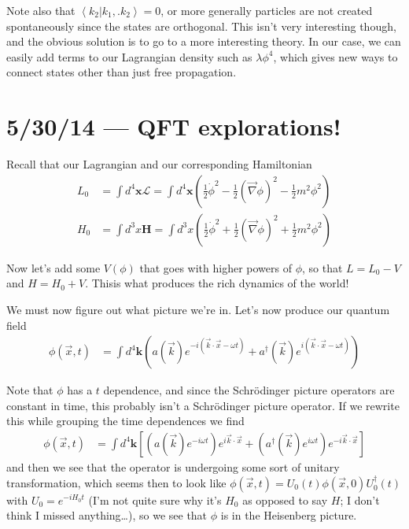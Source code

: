 \documentclass[10pt]{report}
\newcommand{\dotp}[2]{\left<#1\left.\right|#2\right>}
\begin{document}
Note also that $\dotp{k_2}{k_1,. k_2} = 0$, or more generally particles are not created spontaneously since the states are orthogonal. This isn't very interesting though, and the obvious solution is to go to a more interesting theory. In our case, we can easily add terms to our Lagrangian density such as $\lambda \phi^4$, which gives new ways to connect states other than just free propagation.
\chapter{5/30/14 --- QFT explorations!}

Recall that our Lagrangian and our corresponding Hamiltonian
\begin{align}
    L_0 &= \int d^4\mathbf{x} \mathcal{L} = \int d^4\mathbf{x} \left( \frac{1}{2}\dot{\phi}^2 - \frac{1}{2}\left( \vec{\nabla}\phi \right)^2 - \frac{1}{2}m^2\phi^2 \right)\\
    H_0 &= \int d^3x \mathbf{H} = \int d^3x \left( \frac{1}{2}\dot{\phi}^2 + \frac{1}{2}\left( \vec{\nabla}\phi \right)^2 + \frac{1}{2}m^2\phi^2 \right)
\end{align}

Now let's add some $V(\phi)$ that goes with higher powers of $\phi$, so that $L = L_0 - V$ and $H = H_0 + V$. Thisis what produces the rich dynamics of the world!

We must now figure out what picture we're in. Let's now produce our quantum field 
\begin{align}
    \phi(\vec{x},t) &= \int d^4\mathbf{k}\left( a(\vec{k}) e^{-i\left( \vec{k} \cdot \vec{x} - \omega t \right)} + a^\dagger(\vec{k}) e^{i\left( \vec{k} \cdot \vec{x} - \omega t \right)}\right)
\end{align}

Note that $\phi$ has a $t$ dependence, and since the Schr\"odinger picture operators are constant in time, this probably isn't a Schr\"odinger picture operator. If we rewrite this while grouping the time dependences we find
\begin{align}
    \phi(\vec{x},t) &= \int d^4\mathbf{k}\left[ \left( a(\vec{k})e^{-i\omega t} \right)e^{i\vec{k} \cdot \vec{x}} + \left(a^\dagger(\vec{k})e^{i\omega t}\right)e^{-i\vec{k} \cdot \vec{x}} \right]
\end{align}
and then we see that the operator is undergoing some sort of unitary transformation, which seems then to look like $\phi(\vec{x},t) = U_0(t)\phi(\vec{x},0) U_0^\dagger(t)$ with $U_0 = e^{-iH_0t}$ (I'm not quite sure why it's $H_0$ as opposed to say $H$; I don't think I missed anything\dots), so we see that $\phi$ is in the Heisenberg picture. 
\end{document}
